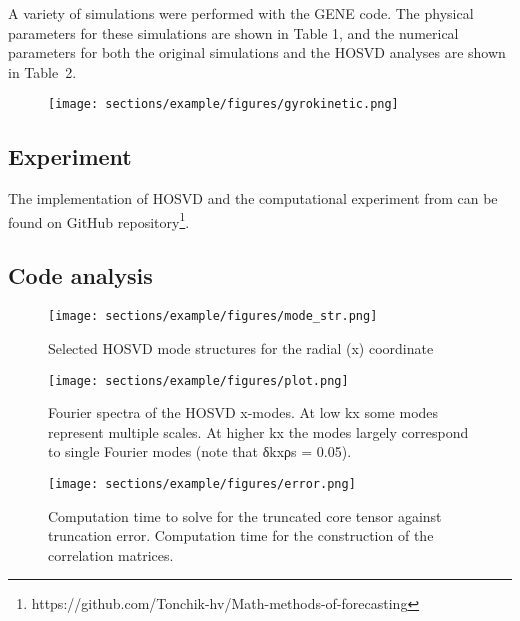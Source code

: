 \documentclass[../../main.tex]{subfiles}
\begin{document}

A variety of simulations were performed with the GENE code. The physical parameters for these simulations are shown in Table 1, and the numerical parameters for both
the original simulations and the HOSVD analyses are shown in Table~2.

\begin{figure}[h]
\centering
\texttt{[image: sections/example/figures/gyrokinetic.png]}
\label{fig:example:1}
\end{figure}


\subsection{Experiment}
The implementation of HOSVD and the computational experiment from \cite{hatch2012analysis} can be found on GitHub repository\footnote{https://github.com/Tonchik-hv/Math-methods-of-forecasting}.

\subsection{Code analysis}

\begin{figure}[h]
\centering
\texttt{[image: sections/example/figures/mode\_str.png]}
\caption{Selected HOSVD mode structures for the radial (x) coordinate}
\label{fig:example:1}
\end{figure}

\begin{figure}[h]
\centering
\texttt{[image: sections/example/figures/plot.png]}
\caption{Fourier spectra of the HOSVD x-modes. At low kx some modes represent multiple scales. At higher kx the modes largely correspond to single Fourier modes (note that δkxρs = 0.05).}
\label{fig:example:1}
\end{figure}


\begin{figure}[h]
\centering
\texttt{[image: sections/example/figures/error.png]}
\caption{ Computation time to solve for the truncated core tensor against truncation error. Computation time for the construction of the correlation matrices.}
\label{fig:example:1}
\end{figure}
\end{document}
